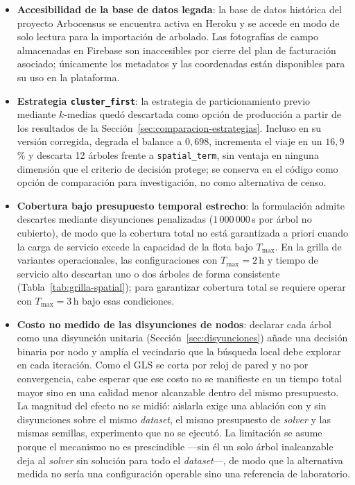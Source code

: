 \begin{itemize}
  \item \textbf{Accesibilidad de la base de datos legada}: la base de datos histórica del
  proyecto Arbocensus se encuentra activa en Heroku y se accede en modo de solo lectura
  para la importación de arbolado. Las fotografías de campo almacenadas en Firebase son
  inaccesibles por cierre del plan de facturación asociado; únicamente los metadatos y
  las coordenadas están disponibles para su uso en la plataforma.

  \item \textbf{Estrategia \texttt{cluster\_first}}: la estrategia de particionamiento
  previo mediante $k$-medias quedó descartada como opción de producción a partir de los
  resultados de la Sección~\ref{sec:comparacion-estrategias}. Incluso en su versión
  corregida, degrada el balance a $0{,}698$, incrementa el viaje en un $16{,}9$\,\% y
  descarta 12 árboles frente a \texttt{spatial\_term}, sin ventaja en ninguna dimensión
  que el criterio de decisión protege; se conserva en el código como opción de comparación
  para investigación, no como alternativa de censo.

  \item \textbf{Cobertura bajo presupuesto temporal estrecho}: la formulación admite
  descartes mediante disyunciones penalizadas ($1\,000\,000$\,s por árbol no cubierto),
  de modo que la cobertura total no está garantizada a priori cuando la carga de servicio
  excede la capacidad de la flota bajo $T_{\max}$. En la grilla de variantes operacionales,
  las configuraciones con $T_{\max}=2$\,h y tiempo de servicio alto descartan uno o dos
  árboles de forma consistente (Tabla~\ref{tab:grilla-spatial}); para garantizar cobertura
  total se requiere operar con $T_{\max}=3$\,h bajo esas condiciones.

  \item \textbf{Costo no medido de las disyunciones de nodos}: declarar cada árbol como
  una disyunción unitaria (Sección~\ref{sec:disyunciones}) añade una decisión binaria
  por nodo y amplía el vecindario que la búsqueda local debe explorar en cada
  iteración. Como el GLS se corta por reloj de pared y no por convergencia, cabe
  esperar que ese costo no se manifieste en un tiempo total mayor sino en una calidad
  menor alcanzable dentro del mismo presupuesto. La magnitud del efecto no se midió:
  aislarla exige una ablación con y sin disyunciones sobre el mismo \textit{dataset},
  el mismo presupuesto de \textit{solver} y las mismas semillas, experimento que no se
  ejecutó. La limitación se asume porque el mecanismo no es prescindible ---sin él un
  solo árbol inalcanzable deja al \textit{solver} sin solución para todo el
  \textit{dataset}---, de modo que la alternativa medida no sería una configuración
  operable sino una referencia de laboratorio.


\end{itemize}
